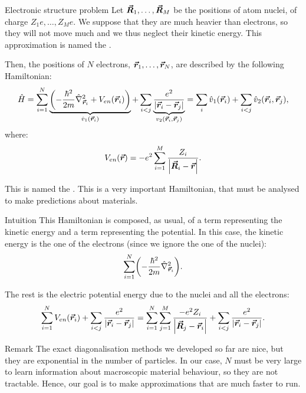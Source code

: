 \documentclass[a4paper]{article}
\begin{document}
\begin{parag}{Electronic structure problem}
    Let $\bm{\protect\vec{R}}_1, \ldots, \bm{\protect\vec{R}}_M$ be the positions of atom nuclei, of charge $Z_1 e, \ldots, Z_M e$. We suppose that they are much heavier than electrons, so they will not move much and we thus neglect their kinetic energy. This approximation is named the .

    Then, the positions of $N$ electrons, $\bm{\protect\vec{r}}_1, \ldots, \bm{\protect\vec{r}}_N$, are described by the following Hamiltonian:
    \[\hat{H} = \sum_{i=1}^{N} \underbrace{\left(-\frac{\hbar^2}{2m} \hat{\nabla}_{\bvec{r}_i}^2 + V_{en}\left(\bvec{r}_i\right)\right)}_{\hat{v}_1\left(\bvec{r}_i\right)} + \sum_{i < j} \underbrace{\frac{e^2}{\left|\bvec{r}_i - \bvec{r}_j\right|}}_{v_2\left(\bvec{r}_i, \bvec{r}_j\right)} = \sum_{i} \hat{v}_1\left(\bvec{r}_i\right) + \sum_{i < j} \hat{v}_2\left(\bvec{r}_i, \bvec{r}_j\right),\]
    where: 
    \[V_{en}\left(\bvec{r}\right) = -e^2 \sum_{i=1}^{M} \frac{Z_i}{\left|\bvec{R}_i - \bvec{r}\right|}.\]

    This is named the . This is a very important Hamiltonian, that must be analysed to make predictions about materials.

    \begin{subparag}{Intuition}
        This Hamiltonian is composed, as usual, of a term representing the kinetic energy and a term representing the potential. In this case, the kinetic energy is the one of the electrons (since we ignore the one of the nuclei): 
        \[\sum_{i=1}^{N} \left(-\frac{\hbar^2}{2m} \hat{\nabla}_{\bvec{r}_i}^2\right).\]
        
        The rest is the electric potential energy due to the nuclei and all the electrons:
        \[\sum_{i=1}^{N} V_{en}\left(\bvec{r}_i\right) + \sum_{i < j} \frac{e^2}{\left|\bvec{r}_i - \bvec{r}_j\right|} = \sum_{i=1}^{N} \sum_{j=1}^{M} \frac{-e^2 Z_i}{\left|\bvec{R}_j - \bvec{r}_i\right|} + \sum_{i < j} \frac{e^2}{\left|\bvec{r}_i - \bvec{r}_j\right|}.\]
    \end{subparag}

    \begin{subparag}{Remark}
        The exact diagonalisation methods we developed so far are nice, but they are exponential in the number of particles. In our case, $N$ must be very large to learn information about macroscopic material behaviour, so they are not tractable. Hence, our goal is to make approximations that are much faster to run.
    \end{subparag}
\end{parag}
\end{document}
